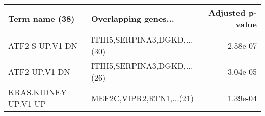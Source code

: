 \begin{tabular}{llr}
\toprule
      Term name (38) &        Overlapping genes... &  Adjusted p-value \\
\midrule
     ATF2 S UP.V1 DN & ITIH5,SERPINA3,DGKD,...(30) &          2.58e-07 \\
       ATF2 UP.V1 DN & ITIH5,SERPINA3,DGKD,...(26) &          3.04e-05 \\
KRAS.KIDNEY UP.V1 UP &    MEF2C,VIPR2,RTN1,...(21) &          1.39e-04 \\
\bottomrule
\end{tabular}
